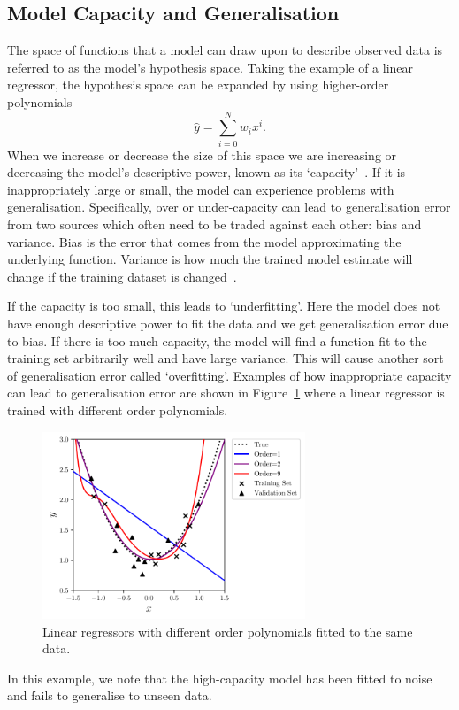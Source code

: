 \subsection{Model Capacity and Generalisation}
The space of functions that a model can draw upon to describe observed data is referred to as the model's hypothesis space.
Taking the example of a linear regressor, the hypothesis space can be expanded by using higher-order polynomials
\begin{equation}
    \hat{y} = \sum_{i=0}^{N}w_{i}x^{i}.
\end{equation}
When we increase or decrease the size of this space we are increasing or decreasing the model's descriptive power, known as its `capacity'~\cite{DeepLearningBook}. If it is inappropriately large or small, the model can experience problems with generalisation.
Specifically, over or under-capacity can lead to generalisation error from two sources which often need to be traded against each other: bias and variance. Bias is the error that comes from the model approximating the underlying function. Variance is how much the trained model estimate will change if the training dataset is changed~\cite{DeepLearningBook}. 

If the capacity is too small, this leads to `underfitting'. Here the model does not have enough descriptive power to fit the data and we get generalisation error due to bias. If there is too much capacity, the model will find a function fit to the training set arbitrarily well and have large variance. This will cause another sort of generalisation error called `overfitting'. Examples of how inappropriate capacity can lead to generalisation error are shown in Figure~\ref{fig:machine_learning:overfitting} where a linear regressor is trained with different order polynomials. 
\begin{figure}[h!]
    \centering
        \includegraphics[width=0.7\textwidth]{figures/machine_learning/capacity.pdf}
    \caption{Linear regressors with different order polynomials fitted to the same data. }
        \label{fig:machine_learning:overfitting}
\end{figure}
In this example, we note that the high-capacity model has been fitted to noise and fails to generalise to unseen data. 

